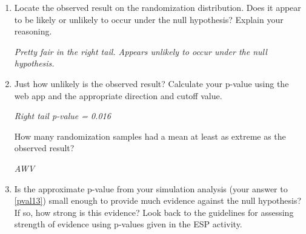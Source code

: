 \begin{enumerate}
\begin{key}
  {\it Again, centered at 0.15, because this is the null value. }
\end{key}

Remember why we conducted this simulation: to assess whether the
observed result (mean of 0.272) would be unlikely to occur by chance
alone if the ground water in New Hampshire is not hazardous. 

\item Locate the observed result on the randomization distribution.
  Does it appear to be likely or unlikely to occur under the null
  hypothesis?  Explain your reasoning.
\begin{students}
  \vspace{1cm}
\end{students}

\begin{key}
  {\it Pretty fair in the right tail.  Appears unlikely to occur under
    the null hypothesis. } 
\end{key}

\item \label{pval13}Just how unlikely is the observed result?  Calculate your
  p-value using the web app and the appropriate direction and cutoff value.
\begin{students}
  \vspace{1cm}
\end{students}

\begin{key}
  {\it Right tail p-value = 0.016}
\end{key}


 How many randomization samples had a mean at least as extreme as the
 observed result?  
\begin{students}
  \vspace{1cm}
\end{students}

\begin{key}
  {\it AWV}
\end{key}

\item Is the approximate p-value from your simulation analysis (your
  answer to \ref{pval13}) small enough to provide much evidence against the
  null hypothesis? If so, how strong is this evidence?  Look back to
  the guidelines for assessing strength of evidence using p-values
  given in the ESP activity.
\begin{students}
  \vspace{1cm}
\end{students}


\end{enumerate}
